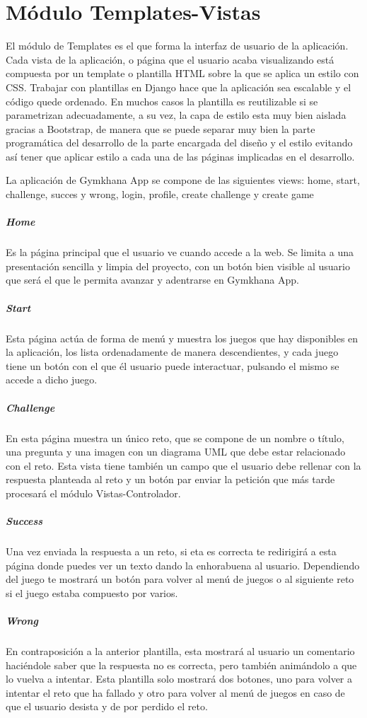 \documentclass[a4paper, 12pt]{book}
\begin{document}
\section{Módulo Templates-Vistas}
El módulo de Templates es el que forma la interfaz de usuario de la aplicación. Cada vista de la aplicación, o página que el usuario acaba visualizando está compuesta por un template o plantilla HTML sobre la que se aplica un estilo con CSS. Trabajar con plantillas en Django hace que la aplicación sea escalable y el código quede ordenado. En muchos casos la plantilla es reutilizable si se parametrizan adecuadamente, a su vez, la capa de estilo esta muy bien aislada gracias a Bootstrap, de manera que se puede separar muy bien la parte programática del desarrollo de la parte encargada del diseño y el estilo evitando así tener que aplicar estilo a cada una de las páginas implicadas en el desarrollo. 

La aplicación de Gymkhana App se compone de las siguientes views: home, start, challenge, succes y wrong, login, profile, create challenge y create game
\subparagraph{Home}
Es la página principal que el usuario ve cuando accede a la web. Se limita a una presentación sencilla y limpia del proyecto, con un botón bien visible al usuario que será el que le permita avanzar y adentrarse en Gymkhana App. 
\subparagraph{Start}
Esta página actúa de forma de menú y muestra los juegos que hay disponibles en la aplicación, los lista ordenadamente de manera descendientes, y cada juego tiene un botón con el que él usuario puede interactuar, pulsando el mismo se accede a dicho juego.  
\subparagraph{Challenge} 
En esta página muestra un único reto, que se compone de un nombre o título, una pregunta y una imagen con un diagrama UML que debe estar relacionado con el reto. Esta vista tiene también un campo que el usuario debe rellenar con la respuesta planteada al reto y un botón par enviar la petición que más tarde procesará el módulo Vistas-Controlador.
\subparagraph{Success}
Una vez enviada la respuesta a un reto, si eta es correcta te redirigirá a esta página donde puedes ver un texto dando la enhorabuena al usuario. Dependiendo del juego te mostrará un botón para volver al menú de juegos o al siguiente reto si el juego estaba compuesto por varios. 
\subparagraph{Wrong}
En contraposición a la anterior plantilla, esta mostrará al usuario un comentario haciéndole saber que la respuesta no es correcta, pero también animándolo a que lo vuelva a intentar. Esta plantilla solo mostrará dos botones, uno para volver a intentar el reto que ha fallado y otro para volver al menú de juegos en caso de que el usuario desista y de por perdido el reto. 
\end{document}
